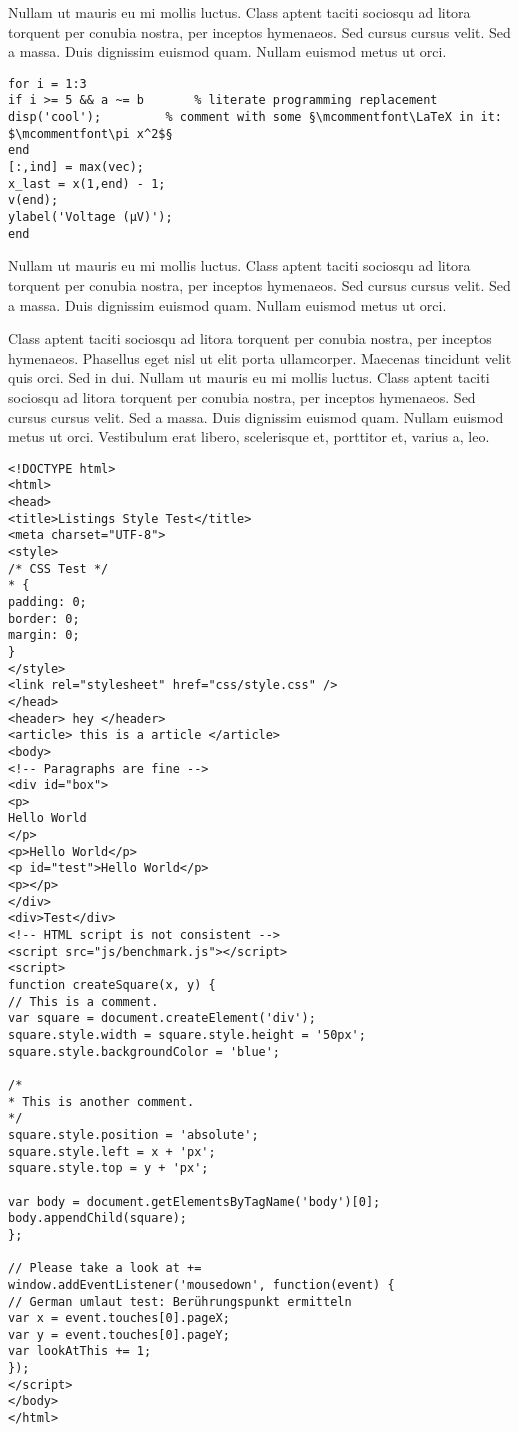 Nullam ut mauris eu mi mollis luctus. Class aptent taciti sociosqu ad litora torquent per conubia nostra, per inceptos hymenaeos. Sed cursus cursus velit. Sed a massa. Duis dignissim euismod quam. Nullam euismod metus ut orci.

\begin{lstlisting}[language=matlabfloz,caption={\mcode{Matlab Function}}]
for i = 1:3
if i >= 5 && a ~= b       % literate programming replacement
disp('cool');         % comment with some §\mcommentfont\LaTeX in it: $\mcommentfont\pi x^2$§
end
[:,ind] = max(vec);
x_last = x(1,end) - 1;
v(end);
ylabel('Voltage (µV)');
end
\end{lstlisting}

Nullam ut mauris eu mi mollis luctus. Class aptent taciti sociosqu ad litora torquent per conubia nostra, per inceptos hymenaeos. Sed cursus cursus velit. Sed a massa. Duis dignissim euismod quam. Nullam euismod metus ut orci.



Class aptent taciti sociosqu ad litora torquent per conubia nostra, per inceptos hymenaeos. Phasellus eget nisl ut elit porta ullamcorper. Maecenas tincidunt velit quis orci. Sed in dui. Nullam ut mauris eu mi mollis luctus. Class aptent taciti sociosqu ad litora torquent per conubia nostra, per inceptos hymenaeos. Sed cursus cursus velit. Sed a massa. Duis dignissim euismod quam. Nullam euismod metus ut orci. Vestibulum erat libero, scelerisque et, porttitor et, varius a, leo.

\begin{lstlisting}[style=htmlcssjs,caption={HTML with CSS Code}]
<!DOCTYPE html>
<html>
<head>
<title>Listings Style Test</title>
<meta charset="UTF-8">
<style>
/* CSS Test */
* {
padding: 0;
border: 0;
margin: 0;
}
</style>
<link rel="stylesheet" href="css/style.css" />
</head>
<header> hey </header>
<article> this is a article </article>
<body>
<!-- Paragraphs are fine -->
<div id="box">			
<p>
Hello World
</p>
<p>Hello World</p>
<p id="test">Hello World</p>
<p></p>
</div>
<div>Test</div>
<!-- HTML script is not consistent -->
<script src="js/benchmark.js"></script>
<script>
function createSquare(x, y) {
// This is a comment.
var square = document.createElement('div');
square.style.width = square.style.height = '50px';
square.style.backgroundColor = 'blue';

/*
* This is another comment.
*/
square.style.position = 'absolute';
square.style.left = x + 'px'; 
square.style.top = y + 'px';

var body = document.getElementsByTagName('body')[0];
body.appendChild(square);
};

// Please take a look at +=
window.addEventListener('mousedown', function(event) {
// German umlaut test: Berührungspunkt ermitteln
var x = event.touches[0].pageX;
var y = event.touches[0].pageY;
var lookAtThis += 1;
});
</script>
</body>
</html>
\end{lstlisting}

